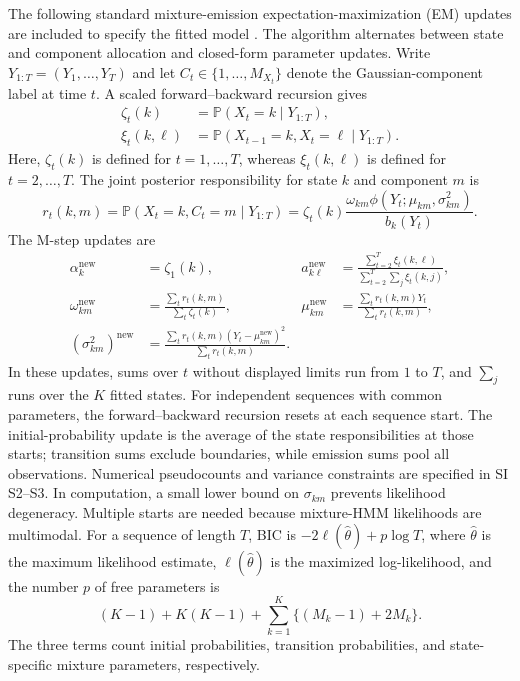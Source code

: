 \documentclass[11pt]{article}
\theoremstyle{definition}
\newcommand{\Pbb}{\mathbb{P}}
\begin{document}
The following standard mixture-emission expectation-maximization (EM)
updates are included to specify the fitted model \citep{VolantEtAl2014}.
The algorithm alternates between state and component allocation and
closed-form parameter updates. Write
$Y_{1:T}=(Y_1,\ldots,Y_T)$ and let $C_t\in\{1,\ldots,M_{X_t}\}$ denote the
Gaussian-component label at time $t$. A scaled forward--backward recursion gives
\begin{align*}
 \zeta_t(k)&=\Pbb(X_t=k\mid Y_{1:T}),\\
 \xi_t(k,\ell)&=\Pbb(X_{t-1}=k,X_t=\ell\mid Y_{1:T}).
\end{align*}
Here, $\zeta_t(k)$ is defined for $t=1,\ldots,T$, whereas
$\xi_t(k,\ell)$ is defined for $t=2,\ldots,T$.
The joint posterior responsibility for state $k$ and component $m$ is
\begin{equation*}
 r_t(k,m)=\Pbb(X_t=k,C_t=m\mid Y_{1:T})=\zeta_t(k)
 \frac{\omega_{km}\phi(Y_t;\mu_{km},\sigma_{km}^2)}{b_k(Y_t)}.
\end{equation*}
The M-step updates are
\begin{align*}
 \alpha_k^{\mathrm{new}}&=\zeta_1(k), &
 a_{k\ell}^{\mathrm{new}}&=
 \frac{\sum_{t=2}^T\xi_t(k,\ell)}
 {\sum_{t=2}^T\sum_j\xi_t(k,j)},\\
 \omega_{km}^{\mathrm{new}}&=
 \frac{\sum_t r_t(k,m)}{\sum_t\zeta_t(k)}, &
 \mu_{km}^{\mathrm{new}}&=
 \frac{\sum_t r_t(k,m)Y_t}{\sum_t r_t(k,m)},\\
 (\sigma_{km}^2)^{\mathrm{new}}&=
 \frac{\sum_t r_t(k,m)(Y_t-\mu_{km}^{\mathrm{new}})^2}
 {\sum_t r_t(k,m)}.
\end{align*}
In these updates, sums over $t$ without displayed limits run from $1$ to $T$,
and $\sum_j$ runs over the $K$ fitted states.
For independent sequences with common parameters, the forward--backward
recursion resets at each sequence start. The initial-probability update is
the average of the state responsibilities at those starts; transition sums
exclude boundaries, while emission sums pool all observations. Numerical
pseudocounts and variance constraints are specified in SI S2--S3.
In computation, a small lower bound on $\sigma_{km}$ prevents likelihood
degeneracy. Multiple starts are needed because mixture-HMM likelihoods are
multimodal. For a sequence of length $T$, BIC is
$-2\ell(\widehat\theta)+p\log T$, where $\widehat\theta$ is the maximum
likelihood estimate, $\ell(\widehat\theta)$ is the maximized log-likelihood,
and the number $p$ of free parameters is
\begin{equation*}
 (K-1)+K(K-1)+\sum_{k=1}^K\{(M_k-1)+2M_k\}.
\end{equation*}
The three terms count initial probabilities, transition probabilities, and
state-specific mixture parameters, respectively.
\end{document}
